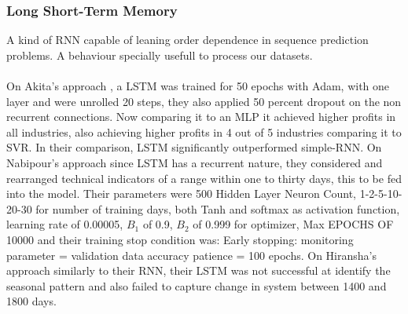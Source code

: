 \documentclass[conference]{IEEEtran}
\begin{document}
\subsubsection{Long Short-Term Memory}
A kind of RNN capable of leaning order dependence in sequence prediction problems. A behaviour specially usefull to process our datasets. 
\\\\
On Akita's approach \cite{Akita2016}, a LSTM was trained for 50 epochs with Adam, with one layer and were unrolled 20 steps, they also applied 50 percent dropout on the non recurrent connections.
Now comparing it to an MLP it achieved higher profits in all industries, also achieving higher profits in 4 out of 5 industries comparing it to SVR. In their comparison, LSTM significantly outperformed simple-RNN.
On Nabipour's approach \cite{nabipour2020predicting} since LSTM has a recurrent nature, they considered and rearranged technical indicators of a range within one to thirty days, this to be fed into the model. Their parameters were 500 Hidden Layer Neuron Count, 1-2-5-10-20-30 for number of training days, both Tanh and softmax as activation function, learning rate of 0.00005, $B_1$ of 0.9, $B_2$ of 0.999 for optimizer, Max EPOCHS OF 10000 and their training stop condition
was: Early stopping: monitoring parameter = validation data accuracy patience = 100 epochs.
On Hiransha's approach \cite{M2018} similarly to their RNN, their LSTM was not successful at  identify the seasonal pattern and also failed to capture change in system between 1400 and 1800 days.
\\\\
\end{document}
